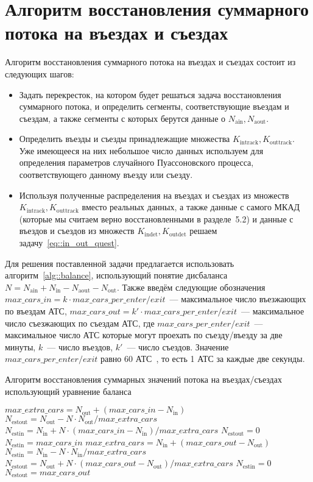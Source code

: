 \section{Алгоритм восстановления суммарного потока на въездах и съездах}
Алгоритм восстановления суммарного потока на въездах и съездах состоит из следующих шагов:
\begin{itemize}
  \item Задать перекресток, на котором будет решаться задача восстановления суммарного потока, и определить сегменты, соответствующие въездам и съездам, а также сегменты с которых берутся данные о $N_\text{ain}, N_\text{aout}$.
  \item Определить въезды и съезды принадлежащие множества $K_\text{intrack}, K_\text{outtrack}$.
  Уже имеющееся на них небольшое число данных используем для определения параметров случайного Пуассоновского процесса, соответствующего данному въезду или съезду.
  \item Используя полученные распределения на въездах и съездах из множеств $K_\text{intrack}, K_\text{outtrack}$ вместо реальных данных, а также данные с самого МКАД (которые мы считаем верно восстановленными в разделе~5.2) и данные с въездов и съездов из множеств $K_\text{indet}, K_\text{outdet}$ решаем задачу~\eqref{eq::in_out_quest}.
\end{itemize}
Для решения поставленной задачи предлагается использовать алгоритм~\ref{alg::balance}, использующий понятие дисбаланса $N = N_\text{ain} + N_\text{in} - N_\text{aout} - N_\text{out}$.
Также введём следующие обозначения $max\_cars\_in = k\cdot max\_cars\_per\_enter/exit$~--- максимальное число въезжающих по въездам АТС, $max\_cars\_out = k'\cdot max\_cars\_per\_enter/exit$~--- максимальное число съезжающих по съездам АТС, где $max\_cars\_per\_enter/exit$~--- максимальное число АТС которые могут проехать по съезду/въезду за две минуты, $k$~--- число въездов, $k'$~--- число съездов.
Значение $max\_cars\_per\_enter/exit$ равно 60 АТС~\cite{introductionMathMod}, то есть 1 АТС за каждые две секунды.
\begin{algorithm}[!ht]
 \caption{Алгоритм восстановления суммарных значений потока на въездах/съездах использующий уравнение баланса}
 \label{alg::balance}
 \begin{algorithmic}
   \STATE $max\_extra\_cars = N_\text{out} + (max\_cars\_in - N_\text{in})$
    \STATE $N_\text{estout} = N_\text{out} - N \cdot N_\text{out} / max\_extra\_cars$
    \STATE $N_\text{estin} = N_\text{in} + N \cdot (max\_cars\_in - N_\text{in}) / max\_extra\_cars$
   \ELSE
    \STATE $N_\text{estout} = 0$
    \STATE $N_\text{estin} = max\_cars\_in$
   \ENDIF
  \ELSE
   \STATE $max\_extra\_cars = N_\text{in} + (max\_cars\_out - N_\text{out})$
    \STATE $N_\text{estin} = N_\text{in} - N \cdot N_\text{in} / max\_extra\_cars$
    \STATE $N_\text{estout} = N_\text{out} + N \cdot (max\_cars\_out - N_\text{out}) / max\_extra\_cars$
   \ELSE
    \STATE $N_\text{estin} = 0$
    \STATE $N_\text{estout} = max\_cars\_out$
   \ENDIF
  \ENDIF
 \ENDIF
 \end{algorithmic}
\end{algorithm}

